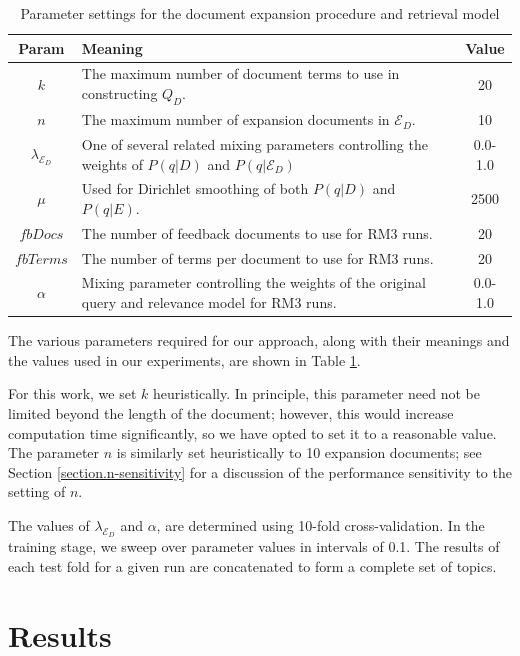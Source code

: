 \documentclass{sig-alternate}
\begin{document}
\begin{table}[htb]
\centering
\begin{tabular}{|c|p{}|c|} \hline
{\bf Param} & {\bf Meaning} & {\bf Value} \\ \hline
$k$ & The maximum number of document terms to use in constructing $Q_D$. & 20 \\ \hline
$n$ & The maximum number of expansion documents in $\mathcal{E}_D$. & 10 \\ \hline
$\lambda_{\mathcal{E}_D}$ & One of several related mixing parameters controlling the weights of $P(q|D)$ and $P(q|\mathcal{E}_D)$ & 0.0-1.0 \\ \hline
$\mu$ & Used for Dirichlet smoothing of both $P(q|D)$ and $P(q|E)$. & 2500 \\ \hline
$fbDocs$ & The number of feedback documents to use for RM3 runs. & 20 \\ \hline
$fbTerms$ & The number of terms per document to use for RM3 runs. & 20 \\ \hline
$\alpha$ & Mixing parameter controlling the weights of the original query and relevance model for RM3 runs. & 0.0-1.0 \\ \hline
\end{tabular}
\caption{Parameter settings for the document expansion procedure and retrieval model}
\label{table.parameters}
\end{table}

The various parameters required for our approach, along with their meanings and the values used in our experiments, are shown in Table \ref{table.parameters}. 

For this work, we set $k$ heuristically. In principle, this parameter need not be limited beyond the length of the document; however, this would increase computation time significantly, so we have opted to set it to a reasonable value. The parameter $n$ is similarly set heuristically to 10 expansion documents; see Section \ref{section.n-sensitivity} for a discussion of the performance sensitivity to the setting of $n$.

The values of $\lambda_{\mathcal{E}_D}$ and $\alpha$, are determined using 10-fold cross-validation. In the training stage, we sweep over parameter values in intervals of 0.1. The results of each test fold for a given run are concatenated to form a complete set of topics.

\section{Results}\label{section.results}
\end{document}
